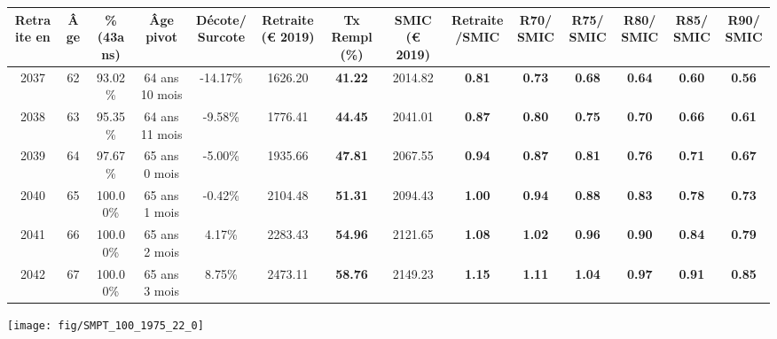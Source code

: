 \begin{adjustbox}{max width=\textwidth} 
\begin{tabular}[htb]{|c|c||c|c|c||c|c||c|c||c|c|c|c|c|} 
\hline 
 Retraite en &  Âge &  \%(43ans) &  Âge pivot &  Décote/Surcote &  Retraite (\euro{} 2019) &  Tx Rempl(\%) &  SMIC (\euro{} 2019) &  Retraite/SMIC &  R70/SMIC &  R75/SMIC &  R80/SMIC &  R85/SMIC &  R90/SMIC \\ 
\hline \hline 
 2037 &  62 &  93.02\% &  64 ans 10 mois &  -14.17\% &  1626.20 &  {\bf 41.22} &  2014.82 &  {\bf {\color{red} 0.81}} &  {\bf {\color{red} 0.73}} &  {\bf {\color{red} 0.68}} &  {\bf {\color{red} 0.64}} &  {\bf {\color{red} 0.60}} &  {\bf {\color{red} 0.56}} \\ 
\hline 
 2038 &  63 &  95.35\% &  64 ans 11 mois &  -9.58\% &  1776.41 &  {\bf 44.45} &  2041.01 &  {\bf {\color{red} 0.87}} &  {\bf {\color{red} 0.80}} &  {\bf {\color{red} 0.75}} &  {\bf {\color{red} 0.70}} &  {\bf {\color{red} 0.66}} &  {\bf {\color{red} 0.61}} \\ 
\hline 
 2039 &  64 &  97.67\% &  65 ans 0 mois &  -5.00\% &  1935.66 &  {\bf 47.81} &  2067.55 &  {\bf {\color{red} 0.94}} &  {\bf {\color{red} 0.87}} &  {\bf {\color{red} 0.81}} &  {\bf {\color{red} 0.76}} &  {\bf {\color{red} 0.71}} &  {\bf {\color{red} 0.67}} \\ 
\hline 
 2040 &  65 &  100.00\% &  65 ans 1 mois &  -0.42\% &  2104.48 &  {\bf 51.31} &  2094.43 &  {\bf 1.00} &  {\bf {\color{red} 0.94}} &  {\bf {\color{red} 0.88}} &  {\bf {\color{red} 0.83}} &  {\bf {\color{red} 0.78}} &  {\bf {\color{red} 0.73}} \\ 
\hline 
 2041 &  66 &  100.00\% &  65 ans 2 mois &  4.17\% &  2283.43 &  {\bf 54.96} &  2121.65 &  {\bf 1.08} &  {\bf 1.02} &  {\bf {\color{red} 0.96}} &  {\bf {\color{red} 0.90}} &  {\bf {\color{red} 0.84}} &  {\bf {\color{red} 0.79}} \\ 
\hline 
 2042 &  67 &  100.00\% &  65 ans 3 mois &  8.75\% &  2473.11 &  {\bf 58.76} &  2149.23 &  {\bf 1.15} &  {\bf 1.11} &  {\bf 1.04} &  {\bf {\color{red} 0.97}} &  {\bf {\color{red} 0.91}} &  {\bf {\color{red} 0.85}} \\ 
\hline 
\hline 
\end{tabular} 
\end{adjustbox} 
 
 \vspace{0.1cm} 

 {\hspace{-2.2cm}\texttt{[image: fig/SMPT\_100\_1975\_22\_0]}} 

